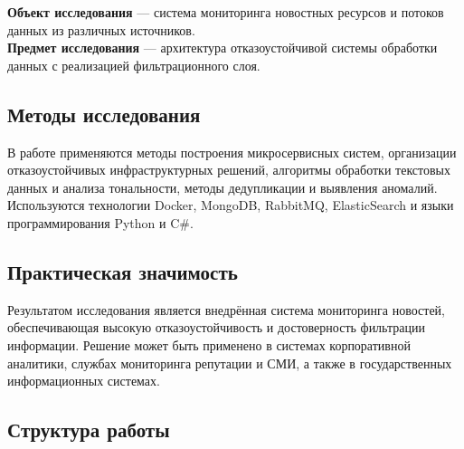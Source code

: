 \textbf{Объект исследования} --- система мониторинга новостных ресурсов
и потоков данных из различных источников.\\
\textbf{Предмет исследования} --- архитектура отказоустойчивой системы
обработки данных с реализацией фильтрационного слоя.

\hypertarget{ux43cux435ux442ux43eux434ux44b-ux438ux441ux441ux43bux435ux434ux43eux432ux430ux43dux438ux44f}{%
\subsection{Методы
исследования}\label{ux43cux435ux442ux43eux434ux44b-ux438ux441ux441ux43bux435ux434ux43eux432ux430ux43dux438ux44f}}

В работе применяются методы построения микросервисных систем,
организации отказоустойчивых инфраструктурных решений, алгоритмы
обработки текстовых данных и анализа тональности, методы дедупликации и
выявления аномалий. Используются технологии Docker, MongoDB, RabbitMQ,
ElasticSearch и языки программирования Python и C\#.

\hypertarget{section-1}{%
\subsection{}\label{section-1}}

\hypertarget{ux43fux440ux430ux43aux442ux438ux447ux435ux441ux43aux430ux44f-ux437ux43dux430ux447ux438ux43cux43eux441ux442ux44c}{%
\subsection{Практическая
значимость}\label{ux43fux440ux430ux43aux442ux438ux447ux435ux441ux43aux430ux44f-ux437ux43dux430ux447ux438ux43cux43eux441ux442ux44c}}

Результатом исследования является внедрённая система мониторинга
новостей, обеспечивающая высокую отказоустойчивость и достоверность
фильтрации информации. Решение может быть применено в системах
корпоративной аналитики, службах мониторинга репутации и СМИ, а также в
государственных информационных системах.

\hypertarget{ux441ux442ux440ux443ux43aux442ux443ux440ux430-ux440ux430ux431ux43eux442ux44b}{%
\subsection{Структура
работы}\label{ux441ux442ux440ux443ux43aux442ux443ux440ux430-ux440ux430ux431ux43eux442ux44b}}

